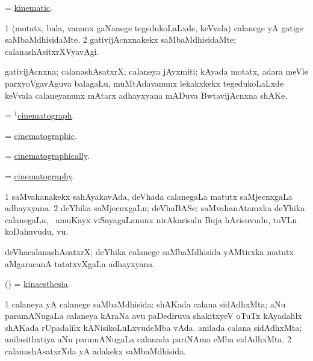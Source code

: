 \bentry
{}
\gl{\gu}
\bmng
 = \hyperlink{kinematic}{kinematic}. 
\emng
\eentry

\bentry
{}
\gl{\kirxvi}
\bmng
\bnum
\num{1} (motatx, bala, \mo vanunx gaNanege tegedukoLaLxde, keVvala) calanege yA gatige saMbaMdhisidaMte. 
\num{2} gativijAcnxnakekx saMbaMdhisidaMte; calanashAsitxrXVyavAgi. 
\enum
\emng
\eentry

\bentry
{}
\gl{\nA}
\bmng
gativijAcnxna; calanashAsatxrX; calaneya jAyxmiti; kAyada motatx, adara meVle parxyoVgavAguva balagaLu, muMtAdavanunx lekakxkekx tegedukoLaLxde keVvala calaneyanunx mAtarx adhayxyana mADuva BwtavijAcnxna shAKe. 
\emng
\eentry

\bentry
{}
\bmng
= \hyperref{kandict_c.pdf}{C}{cinematograph(1)}{$^1$cinematograph}. 
\emng
\eentry

\bentry
{}
\gl{\gu}
\bmng
= \hyperref{kandict_c.pdf}{C}{cinematographic}{cinematographic}. 
\emng
\eentry

\bentry
{}
\gl{\kirxvi}
\bmng
= \hyperref{kandict_c.pdf}{C}{cinematographically}{cinematographically}. 
\emng
\eentry

\bentry
{}
\gl{\nA}
\bmng
= \hyperref{kandict_c.pdf}{C}{cinematography}{cinematography}. 
\emng
\eentry

\bentry
{}
\gl{\nA}
\bmng
\bnum
\num{1} saMvahanakekx sahAyakavAda, deVhada calanegaLa matutx saMjecnxgaLa adhayxyana. 
\num{2} deYhika saMjecnxgaLu; deVhaBASe; saMvahanAtamxka deYhika calanegaLu, \udA\ amuKayx viSayagaLanunx nirAkarisalu Buja hArisuvudu, toVLu koDahuvudu, \mo vu. 
\enum
\emng
\eentry

\bentry
{}
\gl{\nA}
\bmng
deVhacalanashAsatxrX; deYhika calanege saMbaMdhisida yAMtirxka matutx aMgaracanA tatatxvXgaLa adhayxyana. 
\emng
\eentry

\bentry
{}
\gl{\nA}
\bmng
(\ame) =  \hyperlink{kinaesthesia}{kinaesthesia}.
\emng
\eentry

\bentry
{}
\gl{\gu}
\bmng
\bnum
\num{1} calaneya yA calanege saMbaMdhisida:  shAKada calana sidAdhxMta; aNu paramANugaLa calaneya kAraNa avu paDediruva shakitxyeV oTuTx kAyadalilx shAKada rUpadalilx kANisikoLuLxvudeMba vAda.  anilada calana sidAdhxMta; anilasithxtiya {a}Nu paramANugaLa calanada pariNAma eMba sidAdhxMta. 
\num{2} calanashAsatxrXda yA adakekx saMbaMdhisida. 
\enum
\emng
\eentry

